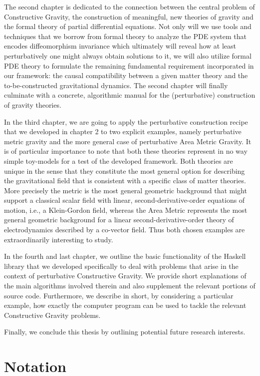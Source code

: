 The second chapter is dedicated to the connection between the central problem of Constructive Gravity, the construction of meaningful, new theories of gravity and the formal theory of partial differential equations. Not only will we use tools and techniques that we borrow from formal theory to analyze the PDE system that encodes diffeomorphism invariance which ultimately will reveal how at least perturbatively one might always obtain solutions to it, we will also utilize formal PDE theory to formulate the remaining fundamental requirement incorporated in our framework: the causal compatibility between a given matter theory and the to-be-constructed gravitational dynamics. The second chapter will finally culminate with a concrete, algorithmic manual for the (perturbative) construction of gravity theories.  

In the third chapter, we are going to apply the perturbative construction recipe that we developed in chapter 2 to two explicit examples, namely perturbative metric gravity and the more general case of perturbative Area Metric Gravity. It is of particular importance to note that both these theories represent in no way simple toy-models for a test of the developed framework. Both theories are unique in the sense that they constitute the most general option for describing the gravitational field that is consistent with a specific class of matter theories. More precisely the metric is the most general geometric background that might support a classical scalar field with linear, second-derivative-order equations of motion, i.e., a Klein-Gordon field, whereas the Area Metric represents the most general geometric background for a linear second-derivative-order theory of electrodynamics described by a co-vector field. Thus both chosen examples are extraordinarily interesting to study.

In the fourth and last chapter, we outline the basic functionality of the Haskell library that we developed specifically to deal with problems that arise in the context of perturbative Constructive Gravity. We provide short explanations of the main algorithms involved therein and also supplement the relevant portions of source code. Furthermore, we describe in short, by considering a particular example, how exactly the computer program can be used to tackle the relevant Constructive Gravity problems.

Finally, we conclude this thesis by outlining potential future research interests.

\section*{Notation}

